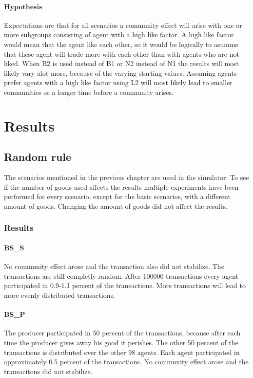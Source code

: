 \documentclass[twoside,openright]{uva-bachelor-thesis}
\begin{document}
\subsubsection{Hypothesis}
Expectations are that for all scenarios a community effect will arise with one or more subgroups consisting of agent with a high like factor. A high like factor would mean that the agent like each other, so it would be logically to asumme that these agent will trade more with each other than with agents who are not liked. When B2 is used instead of B1 or N2 instead of N1 the results will most likely vary alot more, because of the varying starting values. Assuming agents prefer agents with a high like factor using L2 will most likely lead to smaller communities or a longer time before a community arises.

\chapter{Results}

\section{Random rule}
The scenarios mentioned in the previous chapter are used in the simulator. To see if the number of goods used affects the results multiple experiments have been performed for every scenario, except for the basic scenarios, with a different amount of goods. Changing the amount of goods did not affect the results.
\subsection{Results}

\subsubsection{BS\_S}
No community effect arose and the transaction also did not stabilize. The transactions are still completly random. After 100000 transactions every agent participated in 0.9-1.1 percent of the transactions. More transactions will lead to more evenly distributed transactions.

\subsubsection{BS\_P}
The producer participated in 50 percent of the transactions, because after each time the producer gives away his good it perishes. The other 50 percent of the transactions is distributed over the other 98 agents. Each agent participated in approximately 0.5 percent of the transactions. No community effect arose and the transacitons did not stabilize.
\end{document}
